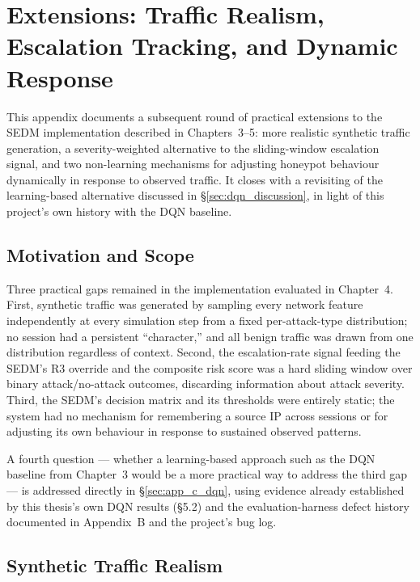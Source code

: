 \chapter{Extensions: Traffic Realism, Escalation Tracking, and Dynamic Response}
\label{app:extensions}

This appendix documents a subsequent round of practical extensions to the
SEDM implementation described in Chapters~3--5: more realistic synthetic
traffic generation, a severity-weighted alternative to the sliding-window
escalation signal, and two non-learning mechanisms for adjusting honeypot
behaviour dynamically in response to observed traffic. It closes with a
revisiting of the learning-based alternative discussed in
\S\ref{sec:dqn_discussion}, in light of this project's own history with
the DQN baseline.

\section{Motivation and Scope}

Three practical gaps remained in the implementation evaluated in
Chapter~4. First, synthetic traffic was generated by sampling every
network feature independently at every simulation step from a fixed
per-attack-type distribution; no session had a persistent ``character,''
and all benign traffic was drawn from one distribution regardless of
context. Second, the escalation-rate signal feeding the SEDM's R3
override and the composite risk score was a hard sliding window over
binary attack/no-attack outcomes, discarding information about attack
severity. Third, the SEDM's decision matrix and its thresholds were
entirely static; the system had no mechanism for remembering a source IP
across sessions or for adjusting its own behaviour in response to
sustained observed patterns.

A fourth question --- whether a learning-based approach such as the DQN
baseline from Chapter~3 would be a more practical way to address the
third gap --- is addressed directly in \S\ref{sec:app_c_dqn}, using
evidence already established by this thesis's own DQN results
(\S5.2) and the evaluation-harness defect history documented in
Appendix~B and the project's bug log.

\section{Synthetic Traffic Realism}

